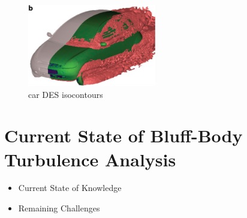 \documentclass[journal]{new-aiaa}
\begin{document}
\begin{figure}[H]
\begin{center}
\includegraphics[width=0.5\textwidth]{Images/logan/spalart2009detachededdy_carDES.pdf}
\caption{ car DES isocontours \cite{mendonca2002towards} }
\label{fig:cardes}
\end{center}
\end{figure}














































\section{Current State of Bluff-Body Turbulence Analysis} \label{sec:currentstate}

\begin{itemize}
    \item Current State of Knowledge
    \item Remaining Challenges
\end{itemize}
\end{document}
